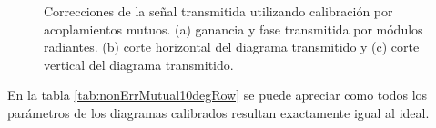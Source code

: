 \begin{figure}[H]
	\centering

	\caption{Correcciones de la señal transmitida utilizando calibración por acoplamientos mutuos. (a) ganancia y fase 
		transmitida por módulos radiantes. (b) corte horizontal del diagrama transmitido y (c) corte vertical del diagrama transmitido.}
	\label{fig:nonErrMutual10degRow}
\end{figure}

En la tabla \ref{tab:nonErrMutual10degRow} se puede apreciar como todos los parámetros de los diagramas calibrados resultan 
exactamente igual al ideal.

